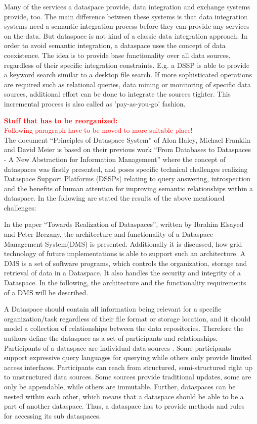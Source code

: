 Many of the services a dataspace provide, data integration and exchange systems provide, too. The main difference between these systems is that data integration systems need a semantic integration process before they can provide any services on the data. But dataspace is not kind of a classic data integration approach. In order to avoid semantic integration, a dataspace uses the concept of data coexistence.  The idea is to provide base functionality over all data sources, regardless of their specific integration constraints. E.g. a DSSP is able to provide a keyword search similar to a desktop file search. If more sophisticated operations are required such as relational queries, data mining or monitoring of specific data sources, additional effort can be done to integrate the sources tighter. This incremental process is also called as 'pay-as-you-go' fashion.


\textcolor{red}{\textbf{Stuff that has to be reorganized:}}\\
\textcolor{red}{Following paragraph have to be moved to more suitable place!}\\
The document ``Principles of Dataspace System'' of Alon Haley, Michael Franklin and David Meier\cite{Halevy:2006:PDS:1142351.1142352} is based on their previous work ``From Databases to Dataspaces - A New Abstraction for Information Management''\cite{Franklin:2005:DDN:1107499.1107502} where the concept of dataspaces was firstly presented, and poses specific technical challenges realizing Dataspace Support Platforms (DSSPs) relating to query answering, introspection and the benefits of human attention for improving semantic relationships within a dataspace.  
In the following are stated the results of the above mentioned challenges:


In the paper ``Towards Realization of Dataspaces'', written by Ibrahim Elsayed and Peter Brezany\cite{1698348}, the architecture and functionality of a Dataspace Management System(DMS) is presented. Additionally it is discussed, how grid technology of future implementations is able to support such an architecture. A DMS is a set of software programs, which controls the organization, storage and retrieval of data in a Dataspace. It also handles the security and integrity of a Dataspace.
In the following, the architecture and the functionality requirements of a DMS will be described.   

A Dataspace should contain all information being relevant for a specific organization/task regardless of their file format or storage location, and it should model a collection of relationships between the data repositories. Therefore the authors define the dataspace as a set of participants and relationships. Participants of a dataspace are individual data sources . Some participants support expressive query languages for querying while others only provide limited access interfaces. Participants can reach from structured, semi-structured right up to unstructured data sources. Some sources provide traditional updates, some are only be appendable, while others are immutable. Further, dataspaces can be nested within each other, which means that a dataspace should be able to be a part of another dataspace.  Thus, a dataspace has to provide methods and rules for accessing its sub dataspaces.


